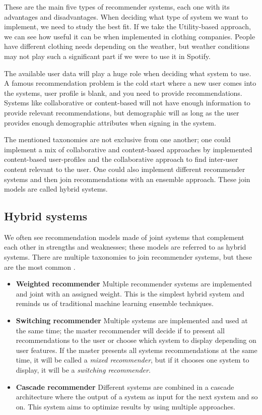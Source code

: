 \documentclass{kththesis}
\begin{document}
These are the main five types of recommender systems, each one with its advantages and disadvantages. When deciding what type of system we want to implement, we need to study the best fit. If we take the Utility-based approach, we can see how useful it can be when implemented in clothing companies. People have different clothing needs depending on the weather, but weather conditions may not play such a significant part if we were to use it in Spotify.

The available user data will play a huge role when deciding what system to use. A famous recommendation problem is the cold start\cite{coldstart} where a new user comes into the systems, user profile is blank, and you need to provide recommendations. Systems like collaborative or content-based will not have enough information to provide relevant recommendations, but demographic will as long as the user provides enough demographic attributes when signing in the system.

The mentioned taxonomies are not exclusive from one another; one could implement a mix of collaborative and content-based approaches by implemented content-based user-profiles and the collaborative approach to find inter-user content relevant to the user. One could also implement different recommender systems and then join recommendations with an ensemble approach. These join models are called hybrid systems.

\subsection{Hybrid systems}
We often see recommendation models made of joint systems that complement each other in strengths and weaknesses; these models are referred to as hybrid systems. There are multiple taxonomies to join recommender systems, but these are the most common \cite{Burke_hybrid}.

\begin{itemize}
    \item \textbf{Weighted recommender} Multiple recommender systems are implemented and joint with an assigned weight. This is the simplest hybrid system and reminds us of traditional machine learning ensemble techniques.
    
    \item \textbf{Switching recommender} Multiple systems are implemented and used at the same time; the master recommender will decide if to present all recommendations to the user or choose which system to display depending on user features. If the master presents all systems recommendations at the same time, it will be called a \textit{mixed recommender}, but if it chooses one system to display, it will be a \textit{switching recommender}.
    \item \textbf{Cascade recommender} Different systems are combined in a cascade architecture where the output of a system as input for the next system and so on. This system aims to optimize results by using multiple approaches.
\end{itemize}
\end{document}
